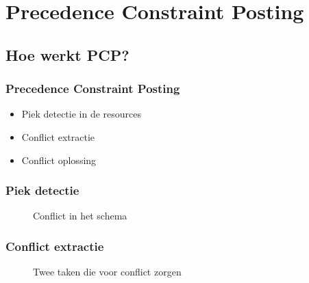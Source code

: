 \documentclass{beamer}
\theoremstyle{definition}
\newcommand{\inputtikz}[1]{}
\begin{document}
\section{Precedence Constraint Posting}


\subsection{Hoe werkt PCP?}
\begin{frame}
	\frametitle{Precedence Constraint Posting}
	\begin{itemize}
		\item Piek detectie in de resources
		\item Conflict extractie
		\item Conflict oplossing
	\end{itemize}
\end{frame}

\begin{frame}
	\frametitle{Piek detectie}
	\vspace{-1.2em}
	\begin{figure}[ht]
		\makebox[\textwidth][c]{\resizebox{.36\paperwidth}{!}{
			\inputtikz{schedule_infeasible_colored_profile}
		}}
		\vspace{-1.3em}
		\caption{Conflict in het schema}
	\end{figure}
\end{frame}

\begin{frame}
	\frametitle{Conflict extractie}
	\vspace{-1.2em}
	\begin{figure}[ht]
		\makebox[\textwidth][c]{\resizebox{.36\paperwidth}{!}{
			\inputtikz{schedule_infeasible_colored_profile_2}
		}}
		\vspace{-1.3em}
		\caption{Twee taken die voor conflict zorgen}
	\end{figure}
\end{frame}
\end{document}
